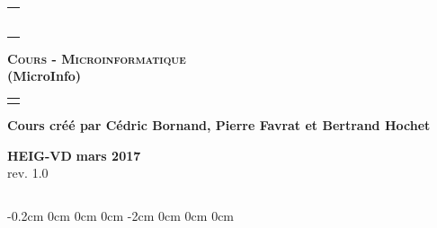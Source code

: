 \documentclass[10pt,a4paper]{book}
\newcommand{\version}{1.0}
\begin{document}
\begin{titlepage}
\begin{tabular}{l}
 \\
 \\
 \\
 \\
 \\
 \\
 \\

\end{tabular}
\begin{center}
\Large\textbf{\textsc{Cours -  Microinformatique} }\\

\Large\textbf{ (MicroInfo)}
\end{center}
\begin{tabular}{c}
 \\
 \\
\end{tabular}
\begin{center}
\textbf{Cours créé par Cédric Bornand, Pierre Favrat et Bertrand Hochet}
\end{center}
\begin{center}
\textbf{HEIG-VD}
\textbf{mars 2017} \\
 rev. \version
\end{center}
\begin{tabular}{c}
 \\ 
\end{tabular}

 \end{titlepage}


\setlength{\textheight}{24cm}

\changepage{1.5cm}%
           {-0.2cm}%
           {0cm}%
           {0cm}%
           {0cm}%
           {-2cm}%
           {0cm}%
           {0cm}%
           {0cm}%
 \setcounter{page}{1}
\end{document}
